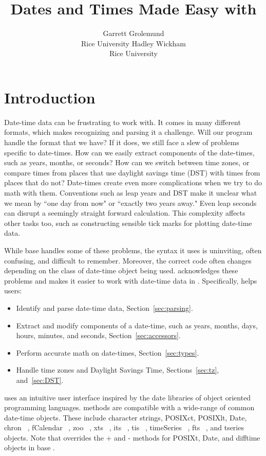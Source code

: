 \documentclass[article]{jss}
\author{Garrett Grolemund\\Rice University \And 
        Hadley Wickham\\Rice University}
\title{Dates and Times Made Easy with \pkg{lubridate}}
\begin{document}
\section{Introduction}

Date-time data can be frustrating to work with. It comes in many different formats, which makes recognizing and parsing it a challenge. Will our program handle the format that we have? If it does, we still face a slew of problems specific to date-times. How can we easily extract components of the date-times, such as years, months, or seconds? How can we switch between time zones, or compare times from places that use daylight savings time (DST) with times from places that do not? Date-times create even more complications when we try to do math with them. Conventions such as leap years and DST make it unclear what we mean by ``one day from now" or ``exactly two years away."  Even leap seconds can disrupt a seemingly straight forward calculation.  This complexity affects other tasks too, such as constructing sensible tick marks for plotting date-time data.

While base  \citep{R} handles some of these problems, the syntax it uses is uninviting, often confusing, and difficult to remember. Moreover, the correct  code often changes depending on the class of date-time object being used.  acknowledges these problems and makes it easier to work with date-time data in . Specifically,  helps users:

\begin{itemize}
   \item Identify and parse date-time data, Section~\ref{sec:parsing}.
   
    \item Extract and modify components of a date-time, such as years, months, days, hours, minutes, and seconds, Section~\ref{sec:accessors}.
  
  \item Perform accurate math on date-times, Section~\ref{sec:types}.
    
  \item Handle time zones and Daylight Savings Time, Sections~\ref{sec:tz}, and~\ref{sec:DST}.
  
\end{itemize}

 uses an intuitive user interface inspired by the date libraries of object oriented programming languages.   methods are compatible with a wide-range of common date-time objects. These include character strings, POSIXct, POSIXlt, Date, chron ~\citep{chron}, fCalendar ~\citep{fCalendar}, zoo ~\citep{zoo}, xts ~\citep{xts}, its ~\citep{its}, tis ~\citep{tis}, timeSeries ~\citep{timeSeries}, fts ~\citep{fts}, and tseries ~\citep{tseries} objects. Note that  overrides the + and - methods for POSIXt, Date, and difftime objects in base .
\end{document}

